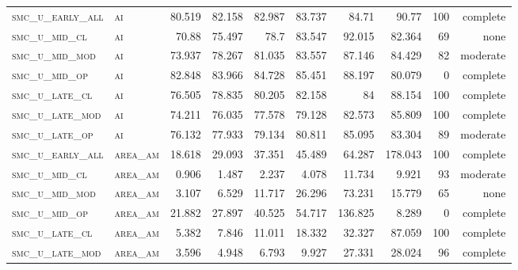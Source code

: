 \begin{landscape}
\begin{center}
\begin{footnotesize}
\begin{longtable}{llrrrrr|rrr}
\textsc{smc\_u\_early\_all} & \textsc{ai        }   & 80.519   & 82.158   & 82.987   & 83.737   & 84.71    & 90.77         & 100           & complete        \\
\textsc{smc\_u\_mid\_cl   } & \textsc{ai        }   & 70.88    & 75.497   & 78.7     & 83.547   & 92.015   & 82.364        & 69            & none        \\
\textsc{smc\_u\_mid\_mod  } & \textsc{ai        }   & 73.937   & 78.267   & 81.035   & 83.557   & 87.146   & 84.429        & 82            & moderate        \\
\textsc{smc\_u\_mid\_op   } & \textsc{ai        }   & 82.848   & 83.966   & 84.728   & 85.451   & 88.197   & 80.079        & 0             & complete            \\
\textsc{smc\_u\_late\_cl  } & \textsc{ai        }   & 76.505   & 78.835   & 80.205   & 82.158   & 84       & 88.154        & 100           & complete        \\
\textsc{smc\_u\_late\_mod } & \textsc{ai        }   & 74.211   & 76.035   & 77.578   & 79.128   & 82.573   & 85.809        & 100           & complete        \\
\textsc{smc\_u\_late\_op  } & \textsc{ai        }   & 76.132   & 77.933   & 79.134   & 80.811   & 85.095   & 83.304        & 89            & moderate        \\
\textsc{smc\_u\_early\_all} & \textsc{area\_am  }   & 18.618   & 29.093   & 37.351   & 45.489   & 64.287   & 178.043       & 100           & complete        \\
\textsc{smc\_u\_mid\_cl   } & \textsc{area\_am  }   & 0.906    & 1.487    & 2.237    & 4.078    & 11.734   & 9.921         & 93            & moderate        \\
\textsc{smc\_u\_mid\_mod  } & \textsc{area\_am  }   & 3.107    & 6.529    & 11.717   & 26.296   & 73.231   & 15.779        & 65            & none        \\
\textsc{smc\_u\_mid\_op   } & \textsc{area\_am  }   & 21.882   & 27.897   & 40.525   & 54.717   & 136.825  & 8.289         & 0             & complete            \\
\textsc{smc\_u\_late\_cl  } & \textsc{area\_am  }   & 5.382    & 7.846    & 11.011   & 18.332   & 32.327   & 87.059        & 100           & complete        \\
\textsc{smc\_u\_late\_mod } & \textsc{area\_am  }   & 3.596    & 4.948    & 6.793    & 9.927    & 27.331   & 28.024        & 96            & complete        \\

\end{longtable}
\end{footnotesize}
\end{center}
\end{landscape}
